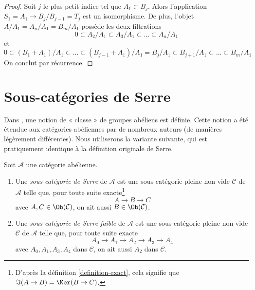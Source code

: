 \begin{proof}
Soit $j$ le plus petit indice tel que $A_1 \subset B_j$.
Alors l'application $S_1 = A_1 \to B_j/B_{j - 1} = T_j$ est un isomorphisme.
De plus, l'objet $A/A_1 = A_n/A_1 = B_m/A_1$
possède les deux filtrations
$$
0 \subset A_2/A_1 \subset A_3/A_1 \subset \ldots \subset A_n/A_1
$$
et
$$
0 \subset (B_1 + A_1)/A_1 \subset \ldots \subset
(B_{j - 1} + A_1)/A_1 = B_j/A_1 \subset B_{j + 1}/A_1
\subset \ldots \subset B_m/A_1
$$
On conclut par récurrence.
\end{proof}






\section{Sous-catégories de Serre}
\label{section-serre-subcategories}

\noindent
Dans \cite[chapitre I, section 1]{Serre_homotopie_classes},
une notion de « classe » de groupes abéliens est définie.
Cette notion a été étendue aux catégories abéliennes par de nombreux auteurs
(de manières légèrement différentes). Nous utiliserons la variante suivante,
qui est pratiquement identique à la définition originale de Serre.

\begin{definition}
\label{definition-serre-subcategory}
\begin{reference}
\cite[Condition (I) on page 259]{Serre_homotopie_classes}
\end{reference}
Soit $\mathcal{A}$ une catégorie abélienne.
\begin{enumerate}
\item Une {\it sous-catégorie de Serre} de $\mathcal{A}$ est une
sous-catégorie pleine non vide $\mathcal{C}$ de $\mathcal{A}$
telle que, pour toute suite exacte\footnote{D'après la
définition \ref{definition-exact}, cela signifie que $\Im(A \to B) = \Ker(B \to C)$.}
$$
A \to B \to C
$$
avec $A, C \in \Ob(\mathcal{C})$, on ait aussi
$B \in \Ob(\mathcal{C})$.
\item Une {\it sous-catégorie de Serre faible} de $\mathcal{A}$ est une
sous-catégorie pleine non vide $\mathcal{C}$ de $\mathcal{A}$ telle que, pour toute
suite exacte
$$
A_0 \to A_1 \to A_2 \to A_3 \to A_4
$$
avec $A_0, A_1, A_3, A_4$ dans $\mathcal{C}$, on ait aussi $A_2$ dans $\mathcal{C}$.
\end{enumerate}
\end{definition}

